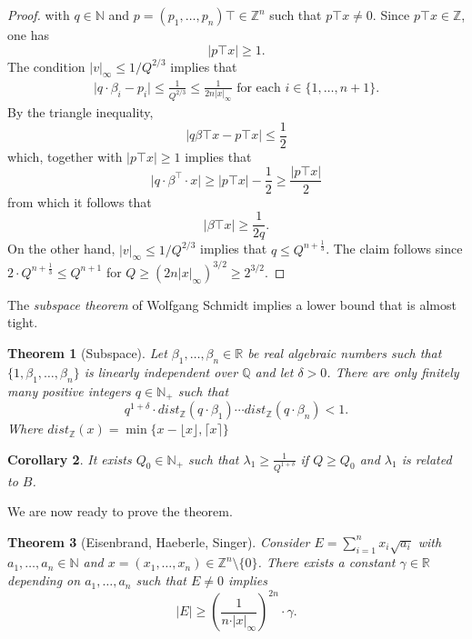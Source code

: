 \documentclass[a4paper,11pt,american]{article}
\newcommand{\N}{\mathbb{N}}
\newcommand{\Q}{\mathbb{Q}}
\newcommand{\R}{\mathbb{R}}
\newcommand{\Z}{\mathbb{Z}}
\theoremstyle{plain}
\newtheorem{theorem}{Theorem}
\newtheorem{corollary}[theorem]{Corollary}
\theoremstyle{definition}
\begin{document}
\begin{proof}
with $q \in \N$ and $p = (p_1,\dots,p_n)\top  \in \Z^n$ such that $p\top  x \neq0$. Since $p\top x \in \Z$, one has
\begin{equation}
  \label{eq:10}
  \vert p\top x\vert  \geq1.
\end{equation}
The condition $\vert v\vert _\infty \leq 1/Q^{2/3}$ implies that
\begin{eqnarray*}
  \vert q \cdot \beta_i - p_i\vert  \leq   \frac{1}{Q^{2/3}} \leq \frac{1}{2 n \vert x\vert _\infty}  \text{  for each  } i \in\{1,\dots,n+1\}.
\end{eqnarray*}
By the triangle inequality, 
\begin{displaymath}
 \vert q \beta\top  x - p\top  x \vert  \leq \frac12
\end{displaymath}
which, together with $\vert p\top  x\vert \geq1$ implies that \begin{equation*}
    \vert q\cdot\beta^\top\cdot x\vert\geq \vert p\top  x\vert-\frac{1}{2}\geq \frac{\vert p\top  x\vert}{2}
\end{equation*}
from which it follows that
\begin{equation*}
  \vert \beta\top  x \vert  \geq \frac{1}{2 q}.
\end{equation*}
%
On the other hand, $\vert v\vert _\infty \leq 1/ Q^{2/3}$ implies that $q \leq Q^{n+\frac{1}{3}}$. The claim follows since $2 \cdot Q^{n+\frac{1}{3}} \leq Q^{n+1}$ for $Q \geq (2 n \vert x\vert _\infty)^{3/2}\geq 2^{3/2}$.
\end{proof}

The \emph{subspace theorem} of Wolfgang Schmidt implies a lower bound that is almost tight. 
\begin{theorem}[Subspace]
  \label{thr:3}
  Let $\beta_1,\dots,\beta_n \in \R$ be real algebraic numbers such that $\{1,\beta_1,\dots,\beta_n\}$ is linearly independent over $\Q$ and let $\delta>0$. There are only finitely many positive integers $q \in \N_+$ such that
  \begin{displaymath}
    q^{1+\delta} \cdot dist_\Z(q\cdot\beta_1) \cdots dist_\Z(q\cdot\beta_n) <1. 
  \end{displaymath}
  Where $dist_\Z(x)=\min\{x-\lfloor x\rfloor,\lceil x\rceil\}$
\end{theorem}
\begin{corollary}
    It exists $Q_0\in\N_+$ such that $\lambda_1\geq \frac{1}{Q^{1+\delta}}$ if $Q\geq Q_0$ and $\lambda_1$ is related to $B$. 
\end{corollary}
We are now ready to prove the theorem.
\begin{theorem}[Eisenbrand, Haeberle, Singer]
  \label{thr:6}
  Consider $ E = \sum_{i=1}^n x_i \sqrt{a_i}$ with  
  $a_1,\dots,a_n\in \N$  and  $x = (x_1,\dots,x_n)\in\Z^n\setminus\{0\}$. There exists a constant $\gamma \in \R$ depending on $a_1,\dots,a_n$ such that $E \neq0$ implies
  \begin{equation}
    \label{eq:12}
    \vert E\vert  \geq  \left( \frac{1}{n \cdot \vert x\vert _\infty}\right)^{2n} \cdot \gamma. 
  \end{equation}
\end{theorem}
\end{document}
